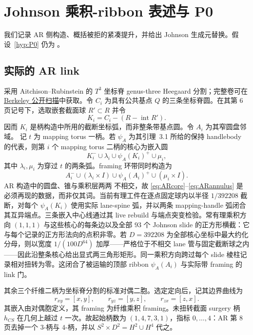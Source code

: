 \section{Johnson 乘积-ribbon 表述与 P0}\label{sec:johnson-presentation}

我们记录 AR 侧构造、概括被拒的紧凑提升，并给出
Johnson 生成元替换。假设~\ref{hyp:P0} 仍为
\Open。

\subsection{实际的 AR link}

采用 Aitchison--Rubinstein
\cite[pp.~5--12]{AitchisonRubinstein1984} 的 $T^3$ 坐标脊 genus-three Heegaard 分割；完整卷可在
\href{https://math.berkeley.edu/~kirby/papers/Gordon%20and%20Kirby%20%28editors%29%20-%20Four-manifold%20theory%20%28Durham%29%20-%20MR0780574.pdf}
{Berkeley 公开扫描}中获取。令 $C_i$ 为具有公共基点 $Q$ 的三条坐标脊圆。在其第 6 页记号下，选取嵌套截面球 $R'\subset R$ 并令
\[
K_i=C_i-(R-\operatorname{int}R').
\]
因而 $K_i$ 是柄构造中所用的截断坐标弧，而非整条带基点圆。令 $A_i$ 为其窄圆盘邻域。
记 $t$ 为 mapping torus 一柄。若 $\psi_A$ 为其引理~3.1 所给的保持 handlebody 的代表，则第 $i$ 个 mapping torus 二柄的核心为嵌入圆
\begin{equation}\label{eq:ARcore}
K_i^-\cup\lambda_i\cup\psi_A(K_i)^+\cup\mu_i,
\end{equation}
其中 $\lambda_i,\mu_i$ 为穿过 $t$ 的两条弧。framing 环带同时构造为
\begin{equation}\label{eq:ARannulus}
A_i^-\cup(\lambda_i\times I)\cup\psi_A(A_i)^+
       \cup(\mu_i\times I).
\end{equation}
AR 构造中的圆盘、锥与乘积层两两
不相交，故 \eqref{eq:ARcore}--\eqref{eq:ARannulus} 是必须再现的数据，而非仅其词。当前有理工件在逐点固定球内以半径 $1/392208$ 截断，对每个 $\psi_A(K_i)$ 使用实际 lane-spine 弧，并以两条 mapping-handle 弧闭合其互异端点。三条嵌入中心线通过其 live rebuild 与端点突变检验。常有理乘积方向 $(1,1,1)$ 与这些核心的每条边以及全部 $93$ 个 Johnson slide 的正方形横截：它与每个记录的正方形法向的点积非零。若 $D=392208$ 为全部核心坐标中最大约化分母，则以宽度 $1/(100D^{64})$ 加厚——严格位于不相交 lane 管与固定截断球之内——因此沿整条核心给出显式两三角形矩形。同一乘积方向跨过每个 slide 棱柱记录相对扭转为零。这闭合了被运输的顶部 ribbon $\psi_A(A_i)$ 与实际带 framing 的 link 门。

其余三个纤维二柄为坐标脊分割的标准对偶二胞。选定定向后，记其边界曲线为
\[
r_{xy}=[x,y],\qquad r_{yz}=[y,z],\qquad r_{zx}=[z,x].
\]
其嵌入由对偶胞定义，其 framing 为纤维乘积 framing。未扭转截面 surgery 柄 $h_{CS}$ 在几何上越过 $t$ 一次。故起始柄数为
$(1,4,7,3,1)$，指标 $0,\ldots,4$：AR 第 8 页去掉一个 $3$-柄与
$4$-柄，并以 $S^2\times D^2=H^2\cup H^4$ 代之。

